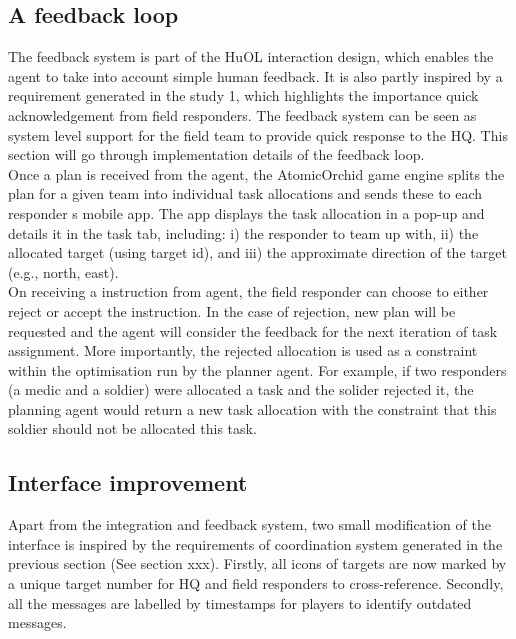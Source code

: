 \subsection{A feedback loop}
The feedback system is part of the HuOL interaction design, which enables the agent to take into account simple human feedback. It is also partly inspired by a requirement generated in the study 1, which highlights the importance quick acknowledgement from field responders. The feedback system can be seen as system level support for the field team to provide quick response to the HQ. This section will go through implementation details of the feedback loop.\\

Once a plan is received from the agent, the AtomicOrchid game engine splits the plan for a given team into individual task allocations and sends these to each responder s mobile app. The app displays the task allocation in a pop-up and details it in the task tab, including: i) the responder to team up with, ii) the allocated target (using target id), and iii) the approximate direction of the target (e.g., north, east).\\

On receiving a instruction from agent, the field responder can choose to either reject or accept the instruction. In the case of rejection, new plan will be requested and the agent will consider the feedback for the next iteration of task assignment. More importantly, the rejected allocation is used as a constraint within the optimisation run by the planner agent. For example, if two responders (a medic and a soldier) were allocated a task and the solider rejected it, the planning agent would return a new task allocation with the constraint that this soldier should not be allocated this task. \\

\subsection{Interface improvement}
Apart from the integration and feedback system, two small modification of the interface is inspired by the requirements of coordination system generated in the previous section (See section xxx). Firstly, all icons of targets are now marked by a unique target number for HQ and field responders to cross-reference. Secondly, all the messages are labelled by timestamps for players to identify outdated messages.\\

